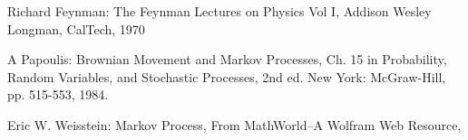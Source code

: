 \documentclass[paper=a4, fontsize=12pt]{scrartcl} %
\numberwithin{equation}{section}
\begin{document}
\newpage

\begin{thebibliography}{9}

Richard Feynman: The Feynman Lectures on Physics Vol I, Addison Wesley Longman, CalTech, 1970

A Papoulis: Brownian Movement and Markov Processes, Ch. 15 in Probability, Random Variables, and Stochastic Processes, 2nd ed. New York: McGraw-Hill, pp. 515-553, 1984.

 Eric W. Weisstein: Markov Process,  From MathWorld--A Wolfram Web Resource, {\color{blue}{http://mathworld.wolfram.com/MarkovProcess.html}}
 
\end{thebibliography}
\end{document}
